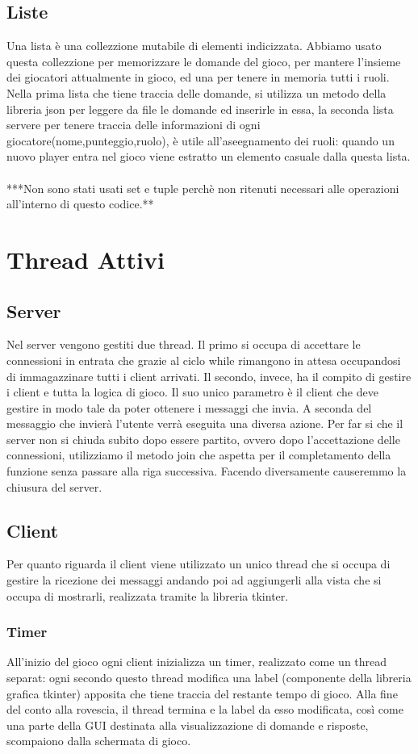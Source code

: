 \documentclass[a4paper,12pt]{report}
\begin{document}
\section{Liste}
Una lista è una collezzione mutabile di elementi indicizzata. Abbiamo usato questa collezzione per memorizzare le domande del gioco, per mantere l'insieme dei giocatori attualmente in gioco, ed una per tenere in memoria tutti i ruoli.
Nella prima lista che tiene traccia delle domande, si utilizza un metodo della libreria json per leggere da file le domande ed inserirle in essa, la seconda lista servere per tenere traccia delle informazioni di ogni giocatore(nome,punteggio,ruolo), 
è utile all'aseegnamento dei ruoli: quando un nuovo player entra nel gioco viene estratto un elemento casuale dalla questa lista.
\\
\\
***Non sono stati usati set e tuple perchè non ritenuti necessari alle operazioni all'interno di questo codice.**
\chapter{Thread Attivi}
\section{Server}
Nel server vengono gestiti due thread. Il primo si occupa di accettare le connessioni in entrata che grazie al ciclo while rimangono in attesa occupandosi di immagazzinare
tutti i client arrivati. Il secondo, invece, ha il compito di gestire i client e tutta la logica di gioco. Il suo unico parametro è il client che deve gestire in modo tale da poter ottenere i messaggi che invia. A seconda
del messaggio che invierà l’utente verrà eseguita una diversa azione. Per far si che il server non si chiuda subito dopo essere partito, ovvero dopo l’accettazione delle connessioni, utilizziamo il metodo join che aspetta per 
il completamento della funzione senza passare alla riga successiva. Facendo diversamente causeremmo la chiusura del server.
\section{Client}
Per quanto riguarda il client viene utilizzato un unico thread che si occupa di gestire la ricezione dei messaggi andando poi ad aggiungerli alla vista che
si occupa di mostrarli, realizzata tramite la libreria tkinter.
\subsection{Timer}
All'inizio del gioco ogni client inizializza un timer, realizzato come un thread separat: ogni secondo questo thread modifica una label (componente della libreria grafica tkinter) apposita che tiene traccia del restante tempo di gioco.
Alla fine del conto alla rovescia, il thread termina e la label da esso modificata, così come una parte della GUI destinata alla visualizzazione di domande e risposte, scompaiono dalla schermata di gioco.
\end{document}
